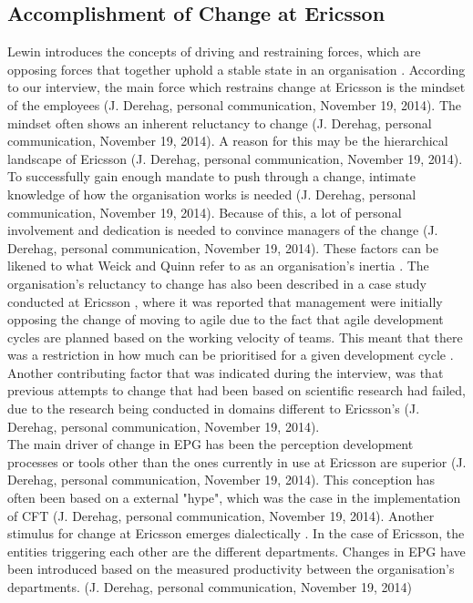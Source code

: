 \documentclass[final_report_innit.tex]{subfiles}
\begin{document}
\subsection{Accomplishment of Change at Ericsson}
Lewin introduces the concepts of driving and restraining forces, which are opposing forces that together uphold a stable state in an organisation \cite{burnes2004kurt}. According to our interview, the main force which restrains change at Ericsson is the mindset of the employees (J. Derehag, personal communication, November 19, 2014). The mindset often shows an inherent reluctancy to change (J. Derehag, personal communication, November 19, 2014). A reason for this may be the hierarchical landscape of Ericsson (J. Derehag, personal communication, November 19, 2014). To successfully gain enough mandate to push through a change, intimate knowledge of how the organisation works is needed (J. Derehag, personal communication, November 19, 2014). Because of this, a lot of personal involvement and dedication is needed to convince managers of the change (J. Derehag, personal communication, November 19, 2014). These factors can be likened to what Weick and Quinn refer to as an organisation's inertia \cite{weick1999organizational}. The organisation's reluctancy to change has also been described in a case study conducted at Ericsson \cite{karlstrom2005combining}, where it was reported that management were initially opposing the change of moving to agile due to the fact that agile development cycles are planned based on the working velocity of teams. This meant that there was a restriction in how much can be prioritised for a given development cycle \cite{karlstrom2005combining}. Another contributing factor that was indicated during the interview, was that previous attempts to change that had been based on scientific research had failed, due to the research being conducted in domains different to Ericsson's (J. Derehag, personal communication, November 19, 2014). 
\\

The main driver of change in EPG has been the perception development processes or tools other than the ones currently in use at Ericsson are superior (J. Derehag, personal communication, November 19, 2014). This conception has often been based on a external "hype", which was the case in the implementation of CFT (J. Derehag, personal communication, November 19, 2014). Another stimulus for change at Ericsson emerges dialectically \cite{van1995explaining}. In the case of Ericsson, the entities triggering each other are the different departments. Changes in EPG have been introduced based on the measured productivity between the organisation's departments. (J. Derehag, personal communication, November 19, 2014)
\\
\end{document}
